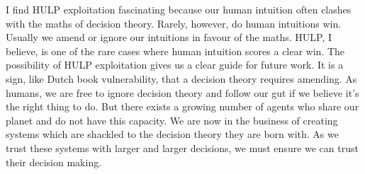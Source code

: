 \documentclass{article}
\begin{document}
I find HULP exploitation fascinating because our human intuition often clashes with the maths of decision theory. Rarely, however, do human intuitions win. Usually we amend or ignore our intuitions in favour of the maths. HULP, I believe, is one of the rare cases where human intuition scores a clear win. The possibility of HULP exploitation gives us a clear guide for future work. It is a sign, like Dutch book vulnerability, that a decision theory requires amending. As humans, we are free to ignore decision theory and follow our gut if we believe it's the right thing to do. But there exists a growing number of agents who share our planet and do not have this capacity. We are now in the business of creating systems which are shackled to the decision theory they are born with. As we trust these systems with larger and larger decisions, we must ensure we can trust their decision making.




\end{document}
